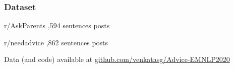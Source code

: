 \begin{frame}[c]\frametitle{Dataset}
    \centering

    r/AskParents ,594 sentences  posts

    r/needadvice ,862 sentences  posts

    \vfill

    Data (and code) available at \href{https://github.com/venkatasg/Advice-EMNLP2020}{\sansc github.com/venkatasg/Advice-EMNLP2020}

\end{frame}

